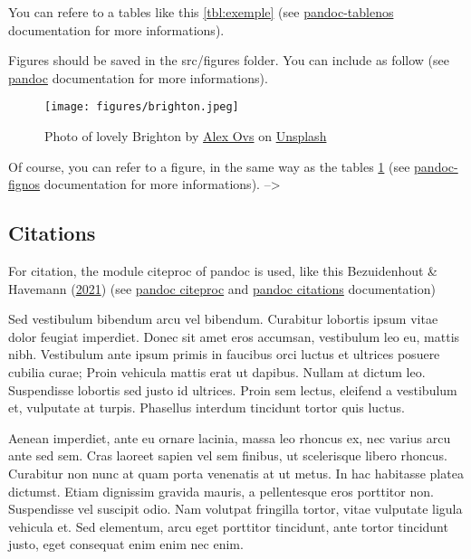 \documentclass[9pt,biorxiv,doublespacing,lineno]{lapreprint}
\newcounter{tableno}
\begin{document}
You can refere to a tables like this \cref{tbl:exemple} (see
\href{https://github.com/tomduck/pandoc-tablenos}{pandoc-tablenos}
documentation for more informations).

Figures should be saved in the src/figures folder. You can include as
follow (see
\href{https://pandoc.org/MANUAL.html\#extension-implicit_figures}{pandoc}
documentation for more informations).

\begin{figure}
\hypertarget{fig:brighton}{%
\centering
\texttt{[image: figures/brighton.jpeg]}
\caption{Photo of lovely Brighton by
\href{https://unsplash.com/es/@sanekovs?utm_source=unsplash\&utm_medium=referral\&utm_content=creditCopyText}{Alex
Ovs} on
\href{https://unsplash.com/s/photos/brighton?utm_source=unsplash\&utm_medium=referral\&utm_content=creditCopyText}{Unsplash}}\label{fig:brighton}
}
\end{figure}

Of course, you can refer to a figure, in the same way as the tables
\cref{fig:brighton} (see
\href{https://github.com/tomduck/pandoc-fignos}{pandoc-fignos}
documentation for more informations). --\textgreater{}

\hypertarget{citations}{%
\subsection{Citations}\label{citations}}

For citation, the module citeproc of pandoc is used, like this
Bezuidenhout \& Havemann
(\protect\hyperlink{ref-Bezuidenhout2021}{2021}) (see
\href{https://pandoc.org/MANUAL.html\#citations}{pandoc citeproc} and
\href{https://pandoc.org/MANUAL.html\#extension-citations}{pandoc
citations} documentation)

Sed vestibulum bibendum arcu vel bibendum. Curabitur lobortis ipsum
vitae dolor feugiat imperdiet. Donec sit amet eros accumsan, vestibulum
leo eu, mattis nibh. Vestibulum ante ipsum primis in faucibus orci
luctus et ultrices posuere cubilia curae; Proin vehicula mattis erat ut
dapibus. Nullam at dictum leo. Suspendisse lobortis sed justo id
ultrices. Proin sem lectus, eleifend a vestibulum et, vulputate at
turpis. Phasellus interdum tincidunt tortor quis luctus.

Aenean imperdiet, ante eu ornare lacinia, massa leo rhoncus ex, nec
varius arcu ante sed sem. Cras laoreet sapien vel sem finibus, ut
scelerisque libero rhoncus. Curabitur non nunc at quam porta venenatis
at ut metus. In hac habitasse platea dictumst. Etiam dignissim gravida
mauris, a pellentesque eros porttitor non. Suspendisse vel suscipit
odio. Nam volutpat fringilla tortor, vitae vulputate ligula vehicula et.
Sed elementum, arcu eget porttitor tincidunt, ante tortor tincidunt
justo, eget consequat enim enim nec enim.
\end{document}
